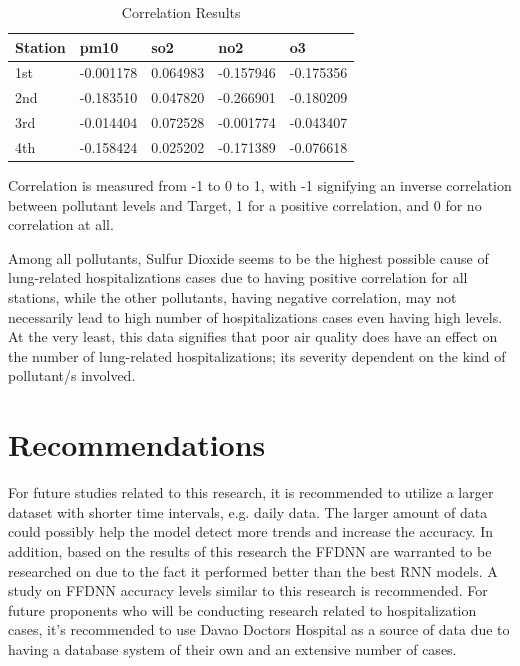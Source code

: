 ﻿\documentclass[10pt,11pt,12pt,oneside]{book}
\begin{document}
\begin{table}
\begin{center}
\begin{tabular}{|l|l|l|l|l|}
\toprule
Station    & pm10  & so2   & no2   & o3    \\
\hline
1st  & -0.001178 & 0.064983   & -0.157946    & -0.175356   \\
\hline
2nd  & -0.183510 & 0.047820 & -0.266901   & -0.180209   \\
\hline
3rd  & -0.014404 & 0.072528  & -0.001774 & -0.043407  \\
\hline
4th & -0.158424 & 0.025202 & -0.171389  & -0.076618    \\
\bottomrule
\end{tabular}
\end{center}
\caption{Correlation Results}
\label{table:correlation}
\end{table}

Correlation is measured from -1 to 0 to 1, with -1 signifying an inverse correlation between pollutant levels and Target, 1 for a positive correlation, and 0 for no correlation at all.

Among all pollutants, Sulfur Dioxide seems to be the highest possible cause of lung-related hospitalizations cases due to having positive correlation for all stations, while the other pollutants, having negative correlation, may not necessarily lead to high number of hospitalizations cases even having high levels. At the very least, this data signifies that poor air quality does have an effect on the number of lung-related hospitalizations; its severity dependent on the kind of pollutant/s involved.


\section{Recommendations}
For future studies related to this research, it is recommended to utilize a larger dataset with shorter time intervals, e.g. daily data. The larger amount of data could possibly help the model detect more trends and increase the accuracy. 
In addition, based on the results of this research the FFDNN are warranted to be researched on due to the fact it performed better than the best RNN models. A study on FFDNN accuracy levels similar to this research is recommended.
For future proponents who will be conducting research related to hospitalization cases, it's recommended to use Davao Doctors Hospital as a source of data due to having a database system of their own and an extensive number of cases.
    
    
\end{document}
